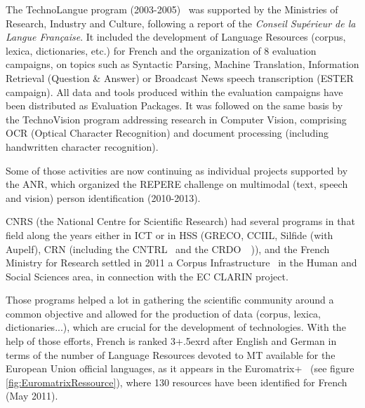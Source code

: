 \begin{multicols}{2}
The TechnoLangue program (2003-2005)~\cite{technolangue} was
supported by the Ministries of Research, Industry and Culture,
following a report of the {\em Conseil Supérieur de la Langue
  Française}. It included the development of Language Resources
(corpus, lexica, dictionaries, etc.) for French and the organization
of 8 evaluation campaigns, on topics such as Syntactic Parsing,
Machine Translation, Information Retrieval (Question \& Answer) or
Broadcast News speech transcription (ESTER campaign). All data and
tools produced within the evaluation campaigns have been distributed
as Evaluation Packages. It was followed on the same basis by the
TechnoVision program addressing research in Computer Vision,
comprising OCR (Optical Character Recognition) and document processing
(including handwritten character recognition). 

Some of those activities are now
continuing as individual projects supported by the ANR, which
organized the REPERE challenge on multimodal (text, speech and vision)
person identification (2010-2013).

CNRS (the National Centre for Scientific Research) had several
programs in that field along the years either in ICT or in HSS (GRECO,
CCIIL, Silfide (with Aupelf), CRN (including the CNTRL~\cite{cnrtl} and the
CRDO~\cite{crdo}~\cite{crdo2})), and the French Ministry for Research settled in 2011 a
Corpus Infrastructure~\cite{infracorpus} in the Human and Social Sciences area, in
connection with the EC CLARIN project.

Those programs helped a lot in gathering the scientific community
around a common objective and allowed for the production of data
(corpus, lexica, dictionaries...), which are crucial for the development
of technologies. With the help of those efforts, French is ranked 3\raise+.5ex\hbox{rd}
after English and German in terms of the number of Language Resources
devoted to MT available for the European Union official languages, as
it appears in the Euromatrix+~\cite{euromatrixplus} (see figure \ref{fig:EuromatrixRessource}), where 130 resources have been identified for French (May 2011).



\end{multicols}
